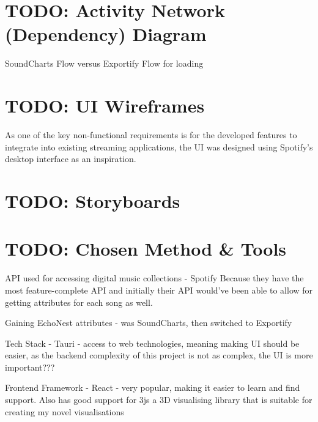 \section{TODO: Activity Network (Dependency) Diagram} %
SoundCharts Flow versus Exportify Flow for loading 

\section{TODO: UI Wireframes}%
As one of the key non-functional requirements is for the developed features to integrate into existing streaming applications, the UI was designed using Spotify's desktop interface as an inspiration.

\section{TODO: Storyboards}%

\section{TODO: Chosen Method \& Tools}%
API used for accessing digital music collections - Spotify
Because they have the most feature-complete API and initially their API would've been able to allow for getting attributes for each song as well.

Gaining EchoNest attributes - was SoundCharts, then switched to Exportify

Tech Stack - Tauri - access to web technologies, meaning making UI should be easier, as the backend complexity of this project is not as complex, the UI is more important??? %

Frontend Framework - React - very popular, making it easier to learn and find support. Also has good support for 3js a 3D visualising library that is suitable for creating my novel visualisations